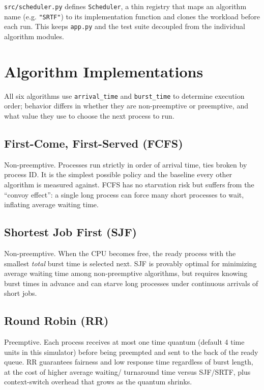 \documentclass[11pt]{article}
\begin{document}
\texttt{src/scheduler.py} defines \texttt{Scheduler}, a thin registry that
maps an algorithm name (e.g. \texttt{"SRTF"}) to its implementation
function and clones the workload before each run. This keeps \texttt{app.py}
and the test suite decoupled from the individual algorithm modules.

\section{Algorithm Implementations}

All six algorithms use \texttt{arrival\_time} and \texttt{burst\_time} to
determine execution order; behavior differs in whether they are
non-preemptive or preemptive, and what value they use to choose the next
process to run.

\subsection{First-Come, First-Served (FCFS)}
Non-preemptive. Processes run strictly in order of arrival time, ties
broken by process ID. It is the simplest possible policy and the baseline
every other algorithm is measured against. FCFS has no starvation risk but
suffers from the ``convoy effect'': a single long process can force many
short processes to wait, inflating average waiting time.

\subsection{Shortest Job First (SJF)}
Non-preemptive. When the CPU becomes free, the ready process with the
smallest \emph{total} burst time is selected next. SJF is provably optimal
for minimizing average waiting time among non-preemptive algorithms, but
requires knowing burst times in advance and can starve long processes
under continuous arrivals of short jobs.

\subsection{Round Robin (RR)}
Preemptive. Each process receives at most one time quantum (default 4
time units in this simulator) before being preempted and sent to the back
of the ready queue. RR guarantees fairness and low response time
regardless of burst length, at the cost of higher average waiting/
turnaround time versus SJF/SRTF, plus context-switch overhead that grows
as the quantum shrinks.
\end{document}
